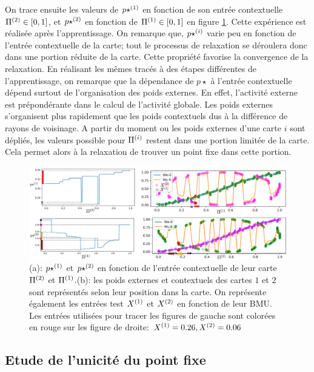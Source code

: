 On trace ensuite les valeurs de $p\star^{({1})}$ en fonction de son entrée contextuelle $\Pi^{({2})} \in [0,1]$, et $p\star^{({2})}$ en fonction de $\Pi^{({1})} \in [0,1]$ en figure \ref{fig:w006}.
Cette expérience est réalisée après l'apprentissage. On remarque que, $p\star^{({i})}$ varie peu en fonction de l'entrée contextuelle de la carte; tout le processus de relaxation se déroulera donc dans une portion réduite de la carte. Cette propriété favorise la convergence de la relaxation.
En réalisant les mêmes tracés à des étapes différentes de l'apprentissage, on remarque que la dépendance de $p\star$ à l'entrée contextuelle dépend surtout de l'organisation des poids externes. En effet, l'activité externe est prépondérante dans le calcul de l'activité globale. Les poids externes s'organisent plus rapidement que les poids contextuels dus à la différence de rayons de voisinage. A partir du moment ou les poids externes d'une carte $i$ sont dépliés, les valeurs possible pour $\Pi^{({i})}$ restent dans une portion limitée de la carte. Cela permet alors à la relaxation de trouver un point fixe dans cette portion.

\begin{figure}
\includegraphics[width=\textwidth]{am_w_006}
\caption{(a): $p\star^{({1})}$ et $p\star^{({2})}$ en fonction de l'entrée contextuelle de leur carte $\Pi^{({2})}$ et $\Pi^{({1})}$.(b): les poids externes et contextuels des cartes $1$ et $2$ sont représentés selon leur position dans la carte. On représente également les entrées test $X^{({1})}$ et $X^{({2})}$ en fonction de leur BMU. Les entrées utilisées pour tracer les figures de gauche sont colorées en rouge sur les figure de droite: $X^{({1})}=0.26,X^{({2})}=0.06$}
\label{fig:w006}
\end{figure}



\subsection{Etude de l'unicité du point fixe}\label{sec:pf}

